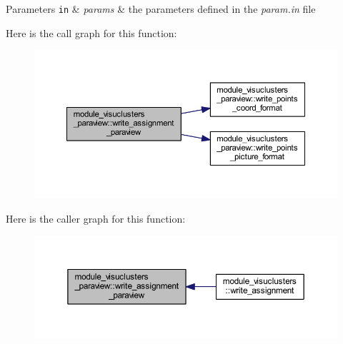 \begin{DoxyParams}[1]{Parameters}
\mbox{\tt in}  & {\em params} & the parameters defined in the \textit{param.in} file \\
\hline
\end{DoxyParams}


Here is the call graph for this function\+:\nopagebreak
\begin{figure}[H]
\begin{center}
\leavevmode
\includegraphics[width=350pt]{namespacemodule__visuclusters__paraview_ad93eb4e679b429c757fcbf8831469a91_cgraph}
\end{center}
\end{figure}




Here is the caller graph for this function\+:\nopagebreak
\begin{figure}[H]
\begin{center}
\leavevmode
\includegraphics[width=350pt]{namespacemodule__visuclusters__paraview_ad93eb4e679b429c757fcbf8831469a91_icgraph}
\end{center}
\end{figure}


\hypertarget{namespacemodule__visuclusters__paraview_a7e7514cf4abb2a7e0a8fa1d23252811e}{}
